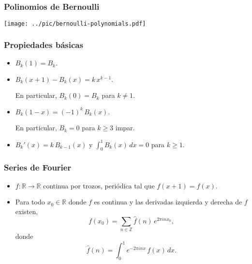 \documentclass[handout]{beamer}
\begin{document}

\begin{frame}
  \frametitle{Polinomios de Bernoulli}

  \begin{center}
    \texttt{[image: ../pic/bernoulli-polynomials.pdf]}
  \end{center}
\end{frame}


\begin{frame}
  \frametitle{Propiedades básicas}

  \begin{itemize}
  \item<1-> $B_k (1) = B_k$.

  \item<2-> $B_k (x+1) - B_k (x) = k\,x^{k-1}$.

    En particular, $B_k (0) = B_k$ para $k \ne 1$.

  \item<3-> $B_k (1-x) = (-1)^k\,B_k (x)$.

    En particular, $B_k = 0$ para $k \ge 3$ impar.

  \item<4-> $B_k' (x) = k\,B_{k-1} (x)$ y $\int_0^1 B_k (x)\,dx = 0$ para $k \ge 1$.
  \end{itemize}
\end{frame}


\begin{frame}
  \frametitle{Series de Fourier}

  \begin{itemize}
    \item $f\colon \mathbb{R} \to \mathbb{R}$ continua por trozos,
      periódica tal que $f (x+1) = f (x)$.

    \item Para todo $x_0\in \mathbb{R}$ donde $f$ es continua y las derivadas
      izquierda y derecha de $f$ existen,
      $$f (x_0) = \sum_{n\in\mathbb{Z}} \widehat{f} (n) \, e^{2\pi i n x_0},$$
      donde
      $$\widehat{f} (n) = \int_0^1 e^{-2\pi i n x} \, f(x) \, dx.$$
  \end{itemize}
\end{frame}
\end{document}
